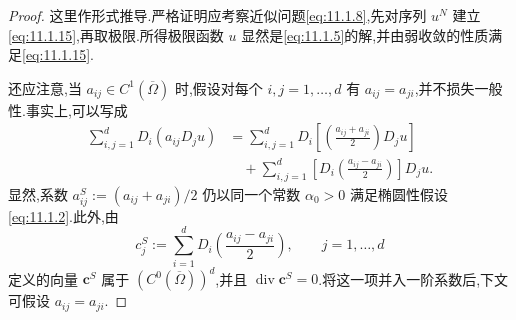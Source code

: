 \begin{proof}
这里作形式推导.严格证明应考察近似问题\eqref{eq:11.1.8},先对序列 \(u^N\) 建立\eqref{eq:11.1.15},再取极限.所得极限函数 \(u\) 显然是\eqref{eq:11.1.5}的解,并由弱收敛的性质满足\eqref{eq:11.1.15}.

还应注意,当 \(a_{ij}\in C^1(\overline\Omega)\) 时,假设对每个 \(i,j=1,\ldots,d\) 有 \(a_{ij}=a_{ji}\),并不损失一般性.事实上,可以写成
\[
  \begin{aligned}
    \sum_{i,j=1}^dD_i(a_{ij}D_ju)
      &=\sum_{i,j=1}^dD_i\left[\left(\frac{a_{ij}+a_{ji}}2\right)D_ju\right]\\
      &\quad+\sum_{i,j=1}^d\left[D_i\left(\frac{a_{ij}-a_{ji}}2\right)\right]D_ju.
  \end{aligned}
\]
显然,系数 \(a_{ij}^S:=(a_{ij}+a_{ji})/2\) 仍以同一个常数 \(\alpha_0>0\) 满足椭圆性假设\eqref{eq:11.1.2}.此外,由
\[
  c_j^S:=\sum_{i=1}^dD_i\left(\frac{a_{ij}-a_{ji}}2\right),\qquad j=1,\ldots,d
\]
定义的向量 \(\boldsymbol{c}^S\) 属于 \((C^0(\overline\Omega))^d\),并且 \(\operatorname{div}\boldsymbol{c}^S=0\).将这一项并入一阶系数后,下文可假设 \(a_{ij}=a_{ji}\).


\end{proof}
